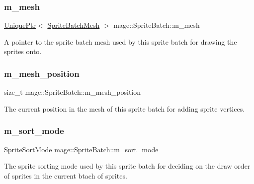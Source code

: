 \subsubsection{\texorpdfstring{m\+\_\+mesh}{m\_mesh}}
{\footnotesize\ttfamily \hyperlink{namespacemage_a3316d7143a973e37adf1110f2e80ca31}{Unique\+Ptr}$<$ \hyperlink{classmage_1_1_sprite_batch_mesh}{Sprite\+Batch\+Mesh} $>$ mage\+::\+Sprite\+Batch\+::m\+\_\+mesh\hspace{0.3cm}{\ttfamily [private]}}

A pointer to the sprite batch mesh used by this sprite batch for drawing the sprites onto. \hypertarget{classmage_1_1_sprite_batch_a208f34270d42e1313cf483ca735dd2ad}{}\label{classmage_1_1_sprite_batch_a208f34270d42e1313cf483ca735dd2ad} 
\subsubsection{\texorpdfstring{m\+\_\+mesh\+\_\+position}{m\_mesh\_position}}
{\footnotesize\ttfamily size\+\_\+t mage\+::\+Sprite\+Batch\+::m\+\_\+mesh\+\_\+position\hspace{0.3cm}{\ttfamily [private]}}

The current position in the mesh of this sprite batch for adding sprite vertices. \hypertarget{classmage_1_1_sprite_batch_a0b2b16b0d9eb63501b6fc0f9ce85e022}{}\label{classmage_1_1_sprite_batch_a0b2b16b0d9eb63501b6fc0f9ce85e022} 
\subsubsection{\texorpdfstring{m\+\_\+sort\+\_\+mode}{m\_sort\_mode}}
{\footnotesize\ttfamily \hyperlink{namespacemage_a6a54e5f6cdb617cd541bd1e05d8b9a24}{Sprite\+Sort\+Mode} mage\+::\+Sprite\+Batch\+::m\+\_\+sort\+\_\+mode\hspace{0.3cm}{\ttfamily [private]}}

The sprite sorting mode used by this sprite batch for deciding on the draw order of sprites in the current btach of sprites. \hypertarget{classmage_1_1_sprite_batch_a285fa1f628e7981c5019bb449c5852ad}{}\label{classmage_1_1_sprite_batch_a285fa1f628e7981c5019bb449c5852ad} 
